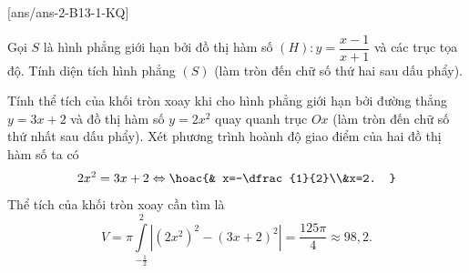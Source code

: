 [ans/ans-2-B13-1-KQ]
\caukq
\begin{ex}%
	Gọi $S$ là hình phẳng giới hạn bởi đồ thị hàm số $(H)\colon y=\dfrac{x-1}{x+1}$ và các trục tọa độ. Tính diện tích hình phẳng $(S)$ (làm tròn đến chữ số thứ hai sau dấu phẩy).
\end{ex}
\begin{ex}%
	Tính thể tích của khối tròn xoay khi cho hình phẳng giới hạn bởi đường thẳng $y=3x+2$ và đồ thị hàm số $y=2x^2$ quay quanh trục $Ox$ (làm tròn đến chữ số thứ nhất sau dấu phẩy).
	\loigiai
	{
		Xét phương trình hoành độ giao điểm của hai đồ thị hàm số ta có \[2x^2=3x+2\Leftrightarrow\hoac{& x=-\dfrac{1}{2}\\&x=2. }\]
		Thể tích của khối tròn xoay cần tìm là
		\[V=\pi\displaystyle\int\limits_{-\tfrac{1}{2}}^{2}\left |\left (2x^2 \right )^2-(3x+2)^2 \right |=\dfrac{125\pi}{4}\approx98{,}2.\]
	}
\end{ex}
